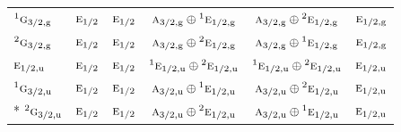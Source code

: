\documentclass[10pt,a4paper]{article}
\numberwithin{equation}{section}
\newcommand{\irr}[1]{\text{\normalfont\scshape #1}}
\newcommand{\conjpair}[1]{{}^{#1}}
\newcommand{\ptag}[1]{\mathrm{#1}}
\begin{document}
{\begin{longtable}{@{}lccccc@{}}
$\conjpair{1}\irr{g}_{3/2,\ptag{g}}$ & $\irr{e}_{1/2}$ & $\irr{e}_{1/2}$ & $\irr{a}_{3/2,\ptag{g}}\oplus \conjpair{1}\irr{e}_{1/2,\ptag{g}}$ & $\irr{a}_{3/2,\ptag{g}}\oplus \conjpair{2}\irr{e}_{1/2,\ptag{g}}$ & $\irr{e}_{1/2,\ptag{g}}$\\
$\conjpair{2}\irr{g}_{3/2,\ptag{g}}$ & $\irr{e}_{1/2}$ & $\irr{e}_{1/2}$ & $\irr{a}_{3/2,\ptag{g}}\oplus \conjpair{2}\irr{e}_{1/2,\ptag{g}}$ & $\irr{a}_{3/2,\ptag{g}}\oplus \conjpair{1}\irr{e}_{1/2,\ptag{g}}$ & $\irr{e}_{1/2,\ptag{g}}$\\
$\irr{e}_{1/2,\ptag{u}}$ & $\irr{e}_{1/2}$ & $\irr{e}_{1/2}$ & $\conjpair{1}\irr{e}_{1/2,\ptag{u}}\oplus \conjpair{2}\irr{e}_{1/2,\ptag{u}}$ & $\conjpair{1}\irr{e}_{1/2,\ptag{u}}\oplus \conjpair{2}\irr{e}_{1/2,\ptag{u}}$ & $\irr{e}_{1/2,\ptag{u}}$\\
$\conjpair{1}\irr{g}_{3/2,\ptag{u}}$ & $\irr{e}_{1/2}$ & $\irr{e}_{1/2}$ & $\irr{a}_{3/2,\ptag{u}}\oplus \conjpair{1}\irr{e}_{1/2,\ptag{u}}$ & $\irr{a}_{3/2,\ptag{u}}\oplus \conjpair{2}\irr{e}_{1/2,\ptag{u}}$ & $\irr{e}_{1/2,\ptag{u}}$\\*
$\conjpair{2}\irr{g}_{3/2,\ptag{u}}$ & $\irr{e}_{1/2}$ & $\irr{e}_{1/2}$ & $\irr{a}_{3/2,\ptag{u}}\oplus \conjpair{2}\irr{e}_{1/2,\ptag{u}}$ & $\irr{a}_{3/2,\ptag{u}}\oplus \conjpair{1}\irr{e}_{1/2,\ptag{u}}$ & $\irr{e}_{1/2,\ptag{u}}$\\
\bottomrule\end{longtable}}
\end{document}
